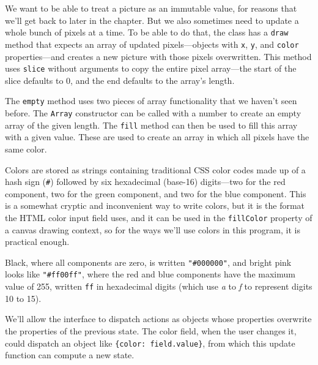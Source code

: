 We want to be able to treat a picture as an immutable value, for reasons that we'll get back to later in the chapter. But we also sometimes need to update a whole bunch of pixels at a time. To be able to do that, the class has a \lstinline`draw` method that expects an array of updated pixels—objects with \lstinline`x`, \lstinline`y`, and \lstinline`color` properties—and creates a new picture with those pixels overwritten. This method uses \lstinline`slice` without arguments to copy the entire pixel array—the start of the slice defaults to 0, and the end defaults to the array's length.

The \lstinline`empty` method uses two pieces of array functionality that we haven't seen before. The \lstinline`Array` constructor can be called with a number to create an empty array of the given length. The \lstinline`fill` method can then be used to fill this array with a given value. These are used to create an array in which all pixels have the same color.

Colors are stored as strings containing traditional CSS color
codes made up of a hash sign (\lstinline`#`) followed by six hexadecimal (base-16) digits—two for the red component, two for the green component, and two for the blue component. This is a somewhat cryptic and inconvenient way to write colors, but it is the format the HTML color input field uses, and it can be used in the \lstinline`fillColor` property of a canvas drawing context, so for the ways we'll use colors in this program, it is practical enough.

Black, where all components are zero, is written \lstinline`"#000000"`, and bright pink looks like \lstinline`"#ff00ff"`, where the red and blue components have the maximum value of 255, written \lstinline`ff` in hexadecimal digits (which use \emph{a} to \emph{f} to represent digits 10 to 15).

We'll allow the interface to dispatch actions as objects whose properties overwrite the properties of the previous state. The color field, when the user changes it, could dispatch an object like \lstinline`{color: field.value}`, from which this update function can compute a new state.

